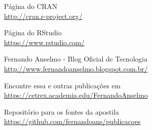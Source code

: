\documentclass[a4paper,11pt]{article}
\begin{document}
\begin{thebibliography}{5}
  Página do CRAN \\
  \url{http://cran.r-project.org/}
  
  Página do RStudio \\
  \url{https://www.rstudio.com/}
  
  Fernando Anselmo - Blog Oficial de Tecnologia \\
  \url{http://www.fernandoanselmo.blogspot.com.br/}

  Encontre essa e outras publicações em \\
  \url{https://cetrex.academia.edu/FernandoAnselmo}

  Repositório para os fontes da apostila \\
  \url{https://github.com/fernandoans/publicacoes}
\end{thebibliography}
  
\end{document}
